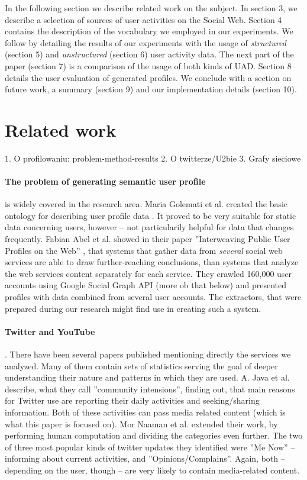 In the following section we describe related work on the subject. In section 3, we describe
a selection of sources of user activities on the Social Web. Section 4 contains the description of
the vocabulary we employed in our experiments. We follow by detailing the results of our experiments
with the usage of \textit{structured} (section 5) and \textit{unstructured} (section 6) user activity data.
The next part of the paper (section 7) is a comparison of the usage of both kinds of UAD. Section 8
details the user evaluation of generated profiles. We conclude with a section on future
work, a summary (section 9) and our implementation details (section 10).

\section{Related work}

1. O profilowaniu: problem-method-results
2. O twitterze/U2bie
3. Grafy sieciowe

\paragraph{The problem of generating semantic user profile} is widely covered in the
research area. Maria Golemati et al. created the basic ontology for describing
user profile data \cite{creating-ontology-for-user-profile}. It proved to be
very suitable for static data concerning users, however -- not particularily
helpful for data that changes frequently. Fabian Abel et al. showed in their
paper ''Interweaving Public User Profiles on the Web'' \cite{public-profiles},
that systems that gather data from \textit{several} social web services are
able to draw further-reaching conclusions, than systems that analyze the web
services content separately for each service. They crawled 160,000 user
accounts using Google Social Graph API (more ob that below) and presented
profiles with data combined from several user accounts.  The extractors, that
were prepared during our research might find use in creating such a system.

\paragraph{Twitter and YouTube}. There have been several papers published
mentioning directly the services we analyzed. Many of them contain sets of
statistics serving the goal of deeper understanding their nature and patterns
in which they are used. A. Java et al. \cite{why-we-twitter} describe, what
they call ''community intensions'', finding out, that main reasons for Twitter
use are reporting their daily activities and seeking/sharing information. Both
of these activities can pass media related content (which is what this paper is
focused on). Mor Naaman et al. \cite{twitter-content-is-it} extended their
work, by performing human computation and dividing the categories even further.
The two of three most popular kinds of twitter updates they identified were
''Me Now'' -- informing about current activities, and ''Opinions/Complains''.
Again, both -- depending on the user, though -- are very likely to contain
media-related content.

